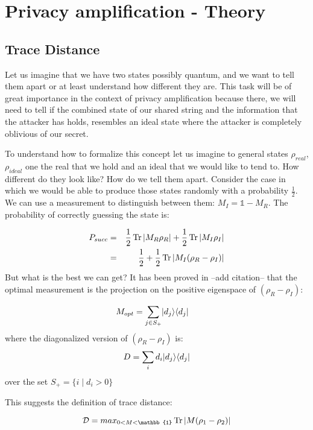 \chapter{Privacy amplification - Theory}\label{chap:PA_theroy} %

\section{Trace Distance}\label{sec:Trace Distance} %


Let us imagine that we have two states possibly quantum, and we want to tell them apart or at least understand how different they are. This task will be of great importance in the context of  privacy amplification because there, we will need to tell if the combined state of our shared string and the information that the attacker has holds, resembles an ideal state where the attacker is completely oblivious of our secret.

To understand how to formalize this concept let us imagine to general states $\rho_{real}$, $\rho_{ideal}$ one the real that we hold and an ideal that we would like to tend to. How different do they look like? How do we tell them apart. Consider the case in which we would be able to produce those states randomly with a probability $\frac{1}{2}$. We can use a measurement to distinguish between them: $M_I = \mathbb{1} - M_R$. The probability of correctly guessing the state is:

\begin{eqnarray}
	P_{succ} &=& \frac{1}{2} \operatorname{Tr} |M_R \rho_R| + \frac{1}{2} \operatorname{Tr} |M_I \rho_I| \\
	&=& \frac{1}{2} + \frac{1}{2} \operatorname{Tr} |M_I (\rho_R - \rho_I)|
	\label{eq:trace_distance_Psucc}
\end{eqnarray}
But what is the best we can get? It has been proved in --add citation-- that the optimal measurement is the projection on the positive eigenspace of $(\rho_R - \rho_I)$:

\begin{eqnarray}
	M_{opt} &= \sum_{j \in S_+} \lvert d_j\rangle\langle d_j\rvert
\end{eqnarray}
where the diagonalized version of $(\rho_R - \rho_I)$ is:
\begin{equation}
	D = \sum_{i} d_i \lvert d_j\rangle\langle d_j\rvert
\end{equation}
over the set $S_+ = \{i \;|\; d_i > 0 \}$

This suggests the definition of trace distance:

\begin{definition}
	$$\mathcal{D} = max_{0<M<\mathbb{1}} \Tr |M(\rho_1 - \rho_2)|$$
\end{definition}


